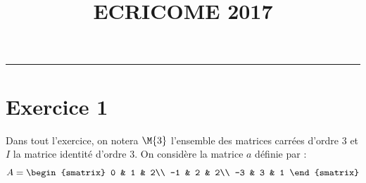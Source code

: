 \documentclass[11pt]{article}%
\title{\bf \vspace{-1.6cm} ECRICOME 2017} %
\author{} %
\date{} %
\begin{document}
 
\maketitle %
\vspace{-1.2cm}\hrule %
\thispagestyle{fancy}
 
\vspace*{.4cm}


\section*{Exercice 1}

\noindent
Dans tout l'exercice, on notera $\M{3}$ l'ensemble des matrices
carrées d'ordre $3$ et $I$ la matrice identité d'ordre $3$. On
considère la matrice $a$ définie par :
\[
A = 
\begin{smatrix}
  0 & 1 & 2\\
  -1 & 2 & 2\\
  -3 & 3 & 1
\end{smatrix}
\]
\end{document}

